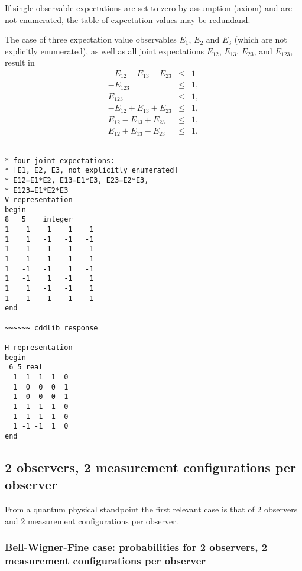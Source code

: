 \documentclass[%
 showpacs,
 showkeys,
 preprintnumbers,
 amsmath,amssymb,
 aps,
  pra,
  longbibliography,
 floatfix,
 ]{revtex4-1}
\begin{document}
If single observable  expectations  are set to zero by assumption (axiom) and are not-enumerated,
the table of expectation values may be redundand.

The case of three expectation value observables
$E_1$, $E_2$  and $E_3$ (which are not explicitly enumerated),
as well as all joint expectations $E_{12}$, $E_{13}$, $E_{23}$, and $E_{123}$,
result in
\begin{eqnarray}
- E_{12}- E_{13}- E_{23} &\le& 1
\\
- E_{123} &\le& 1,
\\
E_{123} &\le& 1,
\\
- E_{12}+ E_{13}+ E_{23} &\le& 1,
\\
 E_{12}- E_{13}+ E_{23} &\le& 1,
\\
 E_{12}+ E_{13}- E_{23} &\le& 1
.
\label{2017-b-1-3-e-ia}
\end{eqnarray}

{ \begin{lstlisting}[backgroundcolor=\color{yellow!10},framerule=0pt,breaklines=true, frame=tb]

* four joint expectations:
* [E1, E2, E3, not explicitly enumerated]
* E12=E1*E2, E13=E1*E3, E23=E2*E3,
* E123=E1*E2*E3
V-representation
begin
8   5    integer
1    1    1    1    1
1    1   -1   -1   -1
1   -1    1   -1   -1
1   -1   -1    1    1
1   -1   -1    1   -1
1   -1    1   -1    1
1    1   -1   -1    1
1    1    1    1   -1
end

~~~~~~ cddlib response

H-representation
begin
 6 5 real
  1  1  1  1  0
  1  0  0  0  1
  1  0  0  0 -1
  1  1 -1 -1  0
  1 -1  1 -1  0
  1 -1 -1  1  0
end

\end{lstlisting}  }


\subsection{2 observers, 2 measurement configurations per observer}
\label{2017-b-totmcpoa}
From a quantum physical standpoint the first relevant case is that of 2 observers and 2 measurement configurations per observer.

\subsubsection{Bell-Wigner-Fine case: probabilities for 2 observers, 2 measurement configurations per observer}
\label{2017-b-bwfa}
\end{document}
